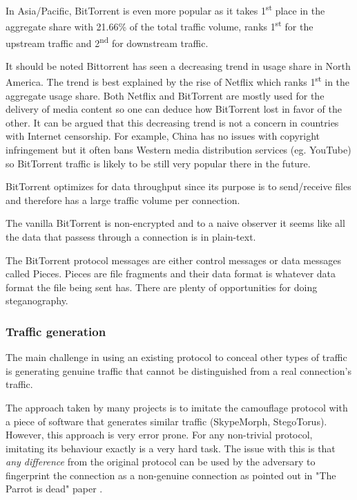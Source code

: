 \documentclass[11pt]{book} %
\begin{document}
In Asia/Pacific, BitTorrent is even more popular as it takes 1\textsuperscript{st} place in the aggregate share with 21.66\% of the total traffic volume, ranks  1\textsuperscript{st} for the upstream traffic and  2\textsuperscript{nd} for downstream traffic.

It should be noted Bittorrent has seen a decreasing trend in usage share in North America. The trend is best explained by the rise of Netflix which ranks 1\textsuperscript{st} in the aggregate usage share. Both Netflix and BitTorrent are mostly used for the delivery of media content so one can deduce how BitTorrent lost in favor of the other. It can be argued that this decreasing trend is not a concern in countries with Internet censorship. For example, China has no issues with copyright infringement but it often bans Western media distribution services (eg. YouTube) so BitTorrent traffic is likely to be still very popular there in the future.

BitTorrent optimizes for data throughput since its purpose is to send/receive files and therefore has a large traffic volume per connection.

The vanilla BitTorrent is non-encrypted and to a naive observer it seems like all the data that passess through a connection is in plain-text.

The BitTorrent protocol messages are either control messages or data messages called Pieces. Pieces are file fragments and their data format is whatever data format the file being sent has. There are plenty of opportunities for doing steganography.


\subsubsection{Traffic generation}

The main challenge in using an existing protocol to conceal other types of traffic is generating genuine traffic that cannot be distinguished from a real connection's traffic.

The approach taken by many projects is to imitate the camouflage protocol with a piece of software that generates similar traffic (SkypeMorph, StegoTorus). However, this approach is very error prone. For any non-trivial protocol, imitating its behaviour exactly is a very hard task. The issue with this is that \textit{any difference} from the original protocol can be used by the adversary to fingerprint the connection as a non-genuine connection as pointed out in "The Parrot is dead" paper  \citep*{deadParrot}.
\end{document}
